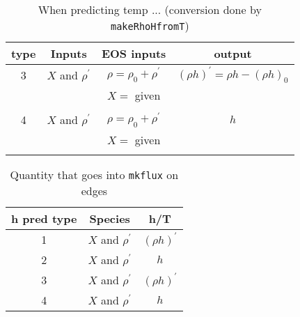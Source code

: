 \begin{table*}
\begin{center}
\caption{When predicting temp ... (conversion done by {\tt makeRhoHfromT}) \newline}
\begin{tabular}{c|c|c|c}
\hline
\hline
{type} & {Inputs } & {EOS inputs} & {output} \\
\hline
3 & $X$ and $\rho^\prime$ & $\rho = \rho_0 + \rho^\prime$ &  $(\rho h)^\prime = \rho h - (\rho h)_0$ \\
   &                   & $   X = $ given & \\
   &                   &                 & \\
 4 & $X$ and $\rho^\prime$ & $\rho = \rho_0 + \rho^\prime$ & $h$ \\
   &                   & $   X = $ given & \\
   &                   &                 & \\
\hline
\end{tabular}
\end{center}
\end{table*}


\begin{table*}
\begin{center}
\caption{Quantity that goes into {\tt mkflux} on edges \newline}
\begin{tabular}{c|c|c}
\hline
\hline
{h pred type} & {Species } & {h/T } \\
\hline
1 & $X$ and $\rho^\prime$ & $(\rho h)^\prime$ \\
2 & $X$ and $\rho^\prime$ & $h$ \\
3 & $X$ and $\rho^\prime$ & $(\rho h)^\prime$ \\
4 & $X$ and $\rho^\prime$ & $h$ \\
\hline
\end{tabular}
\end{center}
\end{table*}


